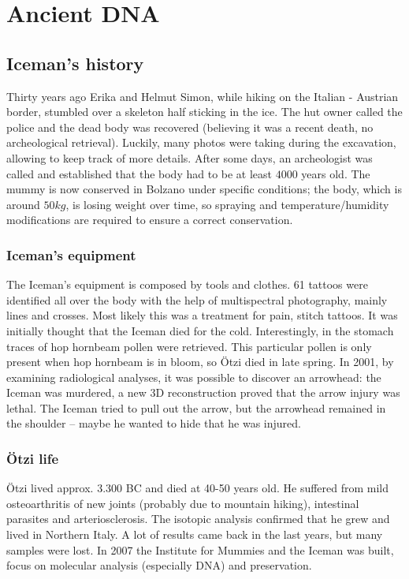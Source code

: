 \graphicspath{{chapters/images/10}}
\chapter{Ancient DNA}

\section{Iceman's history}
Thirty years ago Erika and Helmut Simon, while hiking on the Italian - Austrian border, stumbled over a skeleton half sticking in the ice.
The hut owner called the police and the dead body was recovered (believing it was a recent death, no archeological retrieval).
Luckily, many photos were taking during the excavation, allowing to keep track of more details.
After some days, an archeologist was called and established that the body had to be at least $4000$ years old.
The mummy is now conserved in Bolzano under specific conditions; the body, which is around $50 kg$, is losing weight over time, so spraying and temperature/humidity modifications are required to ensure a correct conservation.

	\subsection{Iceman's equipment}
	The Iceman’s equipment is composed by tools and clothes.
	61 tattoos were identified all over the body with the help of multispectral photography, mainly lines and crosses.
	Most likely this was a treatment for pain, stitch tattoos.
	It was initially thought that the Iceman died for the cold.
	Interestingly, in the stomach traces of hop hornbeam pollen were retrieved.
	This particular pollen is only present when hop hornbeam is in bloom, so Ötzi died in late spring.
	In 2001, by examining radiological analyses, it was possible to discover an arrowhead: the Iceman was murdered, a new 3D reconstruction proved that the arrow injury was lethal.
	The Iceman tried to pull out the arrow, but the arrowhead remained in the shoulder – maybe he wanted to hide that he was injured.

	\subsection{\"Otzi life}
	Ötzi lived approx.
	3.300 BC and died at 40-50 years old.
	He suffered from mild osteoarthritis of new joints (probably due to mountain hiking), intestinal parasites and arteriosclerosis.
	The isotopic analysis confirmed that he grew and lived in Northern Italy.
	A lot of results came back in the last years, but many samples were lost.
	In 2007 the Institute for Mummies and the Iceman was built, focus on molecular analysis (especially DNA) and preservation.

